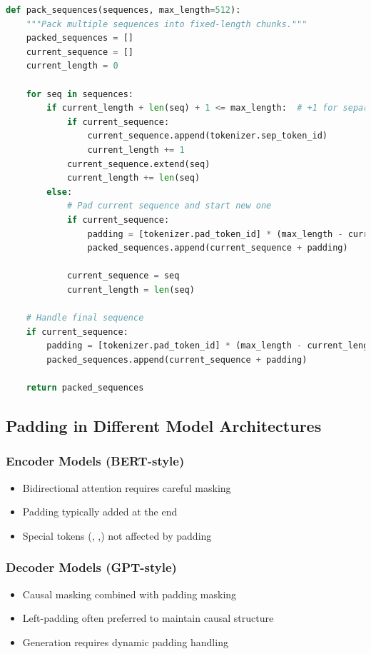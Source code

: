 \begin{lstlisting}[language=Python]
def pack_sequences(sequences, max_length=512):
    """Pack multiple sequences into fixed-length chunks."""
    packed_sequences = []
    current_sequence = []
    current_length = 0
    
    for seq in sequences:
        if current_length + len(seq) + 1 <= max_length:  # +1 for separator
            if current_sequence:
                current_sequence.append(tokenizer.sep_token_id)
                current_length += 1
            current_sequence.extend(seq)
            current_length += len(seq)
        else:
            # Pad current sequence and start new one
            if current_sequence:
                padding = [tokenizer.pad_token_id] * (max_length - current_length)
                packed_sequences.append(current_sequence + padding)
            
            current_sequence = seq
            current_length = len(seq)
    
    # Handle final sequence
    if current_sequence:
        padding = [tokenizer.pad_token_id] * (max_length - current_length)
        packed_sequences.append(current_sequence + padding)
    
    return packed_sequences
\end{lstlisting}

\subsection{Padding in Different Model Architectures}

\subsubsection{Encoder Models (BERT-style)}
\begin{itemize}
\item Bidirectional attention requires careful masking
\item Padding typically added at the end
\item Special tokens (\cls{}, \sep{}) not affected by padding
\end{itemize}

\subsubsection{Decoder Models (GPT-style)}
\begin{itemize}
\item Causal masking combined with padding masking
\item Left-padding often preferred to maintain causal structure
\item Generation requires dynamic padding handling
\end{itemize}

